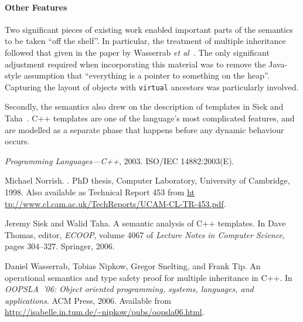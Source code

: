 \documentclass{llncs}
\newcommand{\cpp}{\mbox{C\hspace{-.3mm}+\hspace{-.8mm}+}}
\begin{document}
\paragraph{Other Features} Two significant pieces of existing work
enabled important parts of the semantics to be taken ``off the
shelf''.  In particular, the treatment of multiple inheritance
followed that given in the paper by Wasserrab \emph{et
  al}~\cite{wasserrab-nst-OOPSLA06}. The only significant adjustment
required when incorporating this material was to remove the Java-style
assumption that ``everything is a pointer to something on the heap''.
Capturing the layout of objects with \texttt{virtual} ancestors was
particularly involved.

Secondly, the semantics also drew on the description of templates in
Siek and Taha~\cite{DBLP:conf/ecoop/SiekT06}.  \cpp{} templates are
one of the language's most complicated features, and are modelled as a
separate phase that happens before any dynamic behaviour occurs.

\begin{thebibliography}{1}

{\em Programming Languages---C++}, 2003.
\newblock ISO/IEC 14882:2003(E).

Michael Norrish.
.
\newblock PhD thesis, Computer Laboratory, University of Cambridge, 1998.
\newblock Also available as Technical Report 453 from \url{ht
  tp://www.cl.cam.ac.uk/TechReports/UCAM-CL-TR-453.pdf}.

Jeremy Siek and Walid Taha.
\newblock A semantic analysis of \cpp{} templates.
\newblock In Dave Thomas, editor, {\em ECOOP}, volume 4067 of {\em Lecture
  Notes in Computer Science}, pages 304--327. Springer, 2006.

Daniel Wasserrab, Tobias Nipkow, Gregor Snelting, and Frank Tip.
\newblock An operational semantics and type safety proof for multiple
  inheritance in \cpp.
\newblock In {\em {OOPSLA}~'06: Object oriented programming, systems,
  languages, and applications}. ACM Press, 2006.
\newblock Available from
  \url{http://isabelle.in.tum.de/~nipkow/pubs/oopsla06.html}.

\end{thebibliography}
\end{document}
